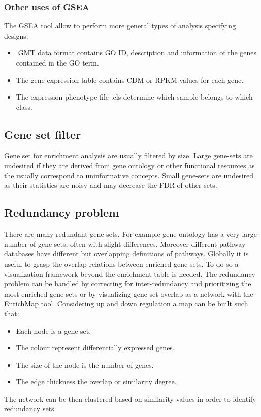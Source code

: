 		\subsubsection{Other uses of GSEA}
		The GSEA tool allow to perform more general types of analysis specifying designs:

		\begin{multicols}{2}
			\begin{itemize}
				\item .GMT data format contains GO ID, description and information of the genes contained in the GO term.
				\item The gene expression table contains CDM or RPKM values for each gene.
				\item The expression phenotype file .cls determine which sample belongs to which class.
			\end{itemize}
		\end{multicols}

	\subsection{Gene set filter}
	Gene set for enrichment analysis are usually filtered by size.
	Large gene-sets are undesired if they are derived from gene ontology or other functional resources as the usually correspond to uninformative concepts.
	Small gene-sets are undesired as their statistics are noisy and may decrease the FDR of other sets.

	\subsection{Redundancy problem}
	There are many redundant gene-sets.
	For example gene ontology has a very large number of gene-sets, often with slight differences.
	Moreover different pathway databases have different but overlapping definitions of pathways.
	Globally it is useful to grasp the overlap relations between enriched gene-sets.
	To do so a visualization framework beyond the enrichment table is needed.
	The redundancy problem can be handled by correcting for inter-redundancy and prioritizing the most enriched gene-sets or by visualizing gene-set overlap as a network with the EnrichMap tool.
	Considering up and down regulation a map can be built such that:

	\begin{multicols}{2}
		\begin{itemize}
			\item Each node is a gene set.
			\item The colour represent differentially expressed genes.
			\item The size of the node is the number of genes.
			\item The edge thickness the overlap or similarity degree.
		\end{itemize}
	\end{multicols}

	The network can be then clustered based on similarity values in order to identify redundancy sets.
